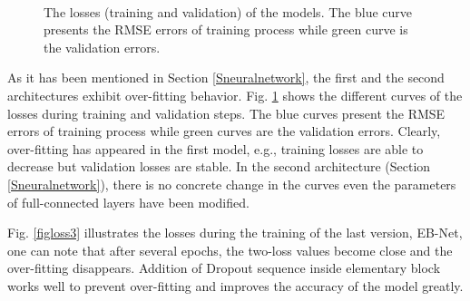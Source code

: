 \documentclass[review]{elsarticle}
\begin{document}
\begin{figure}[htbp]
    \centering
    ~~
\\    
    \caption{The losses (training and validation) of the models. The blue curve presents the RMSE errors of training process while green curve is the validation errors.}
    \label{figlosses}
\end{figure}
As it has been mentioned in Section \ref{Sneuralnetwork}, the first and the second architectures exhibit over-fitting behavior. Fig. \ref{figlosses} shows the different curves of the losses during training and validation steps. The blue curves present the RMSE errors of training process while green curves are the validation errors. Clearly, over-fitting has appeared in the first model, e.g., training losses are able to decrease but validation losses are stable. In the second architecture (Section \ref{Sneuralnetwork}), there is no concrete change in the curves even the parameters of full-connected layers have been modified.

Fig. \ref{figloss3} illustrates the losses during the training of the last version, EB-Net, one can note that after several epochs, the two-loss values become close and the over-fitting disappears. Addition of Dropout sequence inside elementary block works well to prevent over-fitting and improves the accuracy of the model greatly. 
\end{document}
